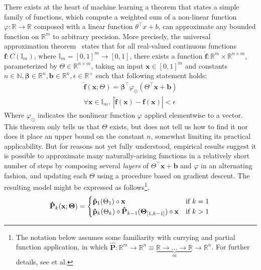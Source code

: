 There exists at the heart of machine learning a theorem that states a simple family of functions, which compute a weighted sum of a non-linear function $\varphi: \mathbb{R} \rightarrow \mathbb{R}$ composed with a linear function $\theta^\intercal x + b$, can approximate any bounded function on $\mathbb{R}^m$ to arbitrary precision. More precisely, the universal approximation theorem~\citep{hornik1989multilayer} states that for all real-valued continuous functions $\mathbf{f}: C(\mathbb{I}_m)$, where $\mathbb{I}_m = [0, 1]^m \rightarrow [0, 1]$, there exists a function $\mathbf{\hat f}: \mathbb{R}^m \times \mathbb{R}^{n \times m}$, parameterized by $\Theta \in \mathbb{R}^{n \times m}$, taking an input $\mathbf x \in [0, 1]^m$ and constants $n \in \mathbb{N}, \mathbf{\beta} \in \mathbb{R}^n, \mathbf{b} \in \mathbb{R}^n, \epsilon \in \mathbb{R}^+$ such that following statement holds:
%
\begin{equation}
    \begin{split}
        \mathbf{\hat{f}}(\mathbf{x}; \Theta) = \mathbf{\beta}^\intercal \varphi_{\odot} \left(\Theta^\intercal \mathbf{x} + \mathbf{b}\right) \\
        \forall \mathbf{x} \in \mathbb{I}_m, \ | \mathbf{\hat f}( \mathbf{x} ) - \mathbf{f} ( \mathbf{x} ) | < \epsilon
    \end{split}
\end{equation}
%
Where $\varphi_{\odot}$ indicates the nonlinear function $\varphi$ applied elementwise to a vector. This theorem only tells us that $\Theta$ exists, but does not tell us how to find it nor does it place an upper bound on the constant $n$, somewhat limiting its practical applicability. But for reasons not yet fully understood, empirical results suggest it is possible to approximate many naturally-arising functions in a relatively short number of steps by composing several \textit{layers} of $\Theta^\intercal \mathbf{x} + \mathbf{b}$ and $\varphi$ in an alternating fashion, and updating each $\Theta$ using a procedure based on gradient descent. The resulting model might be expressed as follows\footnote{The notation below assumes some familiarity with currying and partial function application, in which $\mathbf{\hat P}: \mathbb{R}^m \rightarrow \mathbb{R}^n \equiv \underbrace{\mathbb R \rightarrow \ldots \rightarrow \mathbb R}_{m}\rightarrow \mathbb{R}^n$. For further details, see \citet{schonfinkel1924bausteine, curry1958combinatory} et al.},
%
\begin{equation} \label{eq:recursive_parametric_eq}
\mathbf{\hat P}_k(\mathbf{x}; \bm\Theta) = \begin{cases} \mathbf{\hat p}_1(\Theta_1)\circ\mathbf{x} &\text{if } k=1\\ \mathbf{\hat p}_k(\Theta_k)\circ \mathbf{\hat P}_{k-1}(\bm\Theta_{[1, k-1]})\circ\mathbf{x}&\text{if } k > 1 \end{cases} \\
\end{equation}
